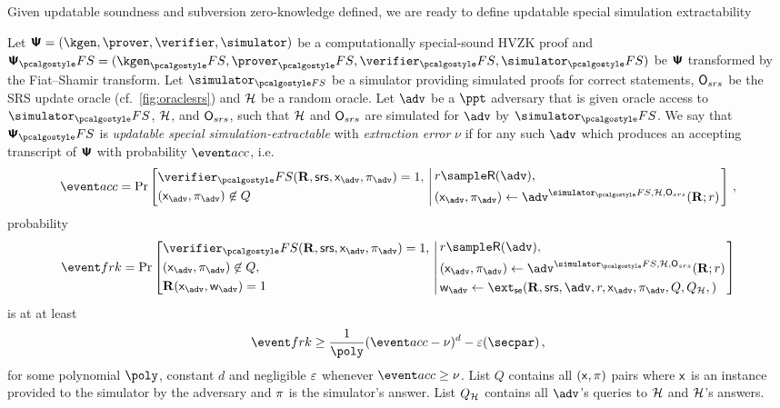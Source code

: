 \documentclass[runningheads,11pt]{llncs}
\begin{document}
Given updatable soundness and subversion zero-knowledge defined, we are ready to
define updatable special simulation extractability
\begin{definition}
  \label{def:upsimext}
    Let $\ps = (\kgen, \prover, \verifier, \simulator)$ be a computationally
    special-sound HVZK proof and
    $\ps_\fs = (\kgen_\fs, \prover_\fs, \verifier_\fs, \simulator_\fs)$ be $\bm{\mathsf{\Psi}}$
    transformed by the Fiat--Shamir transform. Let $\simulator_{\fs}$ be a
    simulator providing simulated proofs for correct statements, $\mathsf{O}_{srs}$ be
    the SRS update oracle (cf.~\cref{fig:oraclesrs}) and $\mathcal{H}$ be a random
    oracle.  Let $\adv$ be a $\ppt$ adversary that is given oracle access to
    $\simulator_\fs$, $\mathcal{H}$, and $\mathsf{O}_{srs}$, such that $\mathcal{H}$ and $\mathsf{O}_{srs}$
    are simulated for $\adv$ by $\simulator_\fs$.  We say that $\ps_\fs$ is
    \emph{updatable special simulation-extractable} with \emph{extraction error}
    $\nu$ if for any such $\adv$ which produces an accepting transcript of $\bm{\mathsf{\Psi}}$
    with probability $\accProb$, i.e.~
    	\[
		\accProb = \Pr \left[
		\begin{aligned}
			& \verifier_\fs(\REL, \srs, \inp_{\advse}, \zkproof_{\advse}) = 1,\\
			& (\inp_{\advse}, \zkproof_{\advse}) \not\in Q
		\end{aligned}
		\, \left| \,
		\begin{aligned}
			& r \sample \RND{\advse}, \\
			& (\inp_{\advse}, \zkproof_{\advse}) \gets \advse^{\simulator_\fs, \ro,
        \oraclesrs} (\REL; r)
		\end{aligned}
		\right.\right]\,,
	\]
	probability
	\[
		\frkProb = \Pr \left[
		\begin{aligned}
			& \verifier_\fs(\REL, \srs, \inp_{\advse}, \zkproof_{\advse}) = 1,\\
			& (\inp_{\advse}, \zkproof_{\advse}) \not\in Q,\\
			& \REL(\inp_{\advse}, \wit_{\advse}) = 1
		\end{aligned}
		\, \left| \,
		\begin{aligned}
			& r \sample \RND{\advse},\\
			& (\inp_{\advse}, \zkproof_{\advse}) \gets \advse^{\simulator_\fs,
        \ro,\oraclesrs} (\REL; r) \\
			& \wit_{\advse} \gets \ext_\se (\REL, \srs, \advse, r, \inp_{\advse},
      \zkproof_{\advse}, Q, Q_\ro,)
		\end{aligned}
		\right.\right]
	\]
	is at at least 
	\[
		\frkProb \geq \frac{1}{\poly} (\accProb - \nu)^d - \eps(\secpar)\,,
	\]
	for some polynomial $\poly$, constant $d$ and negligible $\varepsilon$ whenever
  $\accProb \geq \nu$. List $Q$ contains all $(\mathsf{x}, \pi)$ pairs where
  $\mathsf{x}$ is an instance provided to the simulator by the adversary and
  $\pi$ is the simulator's answer. List $Q_{\mathcal{H}}$ contains all $\advse$'s
  queries to $\mathcal{H}$ and $\mathcal{H}$'s answers.
\end{definition}
\end{document}

